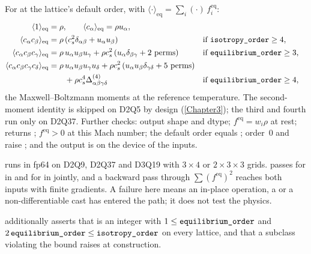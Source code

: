 For  at the lattice's default order, with
$\langle\cdot\rangle_{\mathrm{eq}} = \sum_i (\cdot)\, f^{\mathrm{eq}}_i$:
\begin{align}
\langle 1 \rangle_{\mathrm{eq}} &= \rho, \qquad
\langle c_\alpha \rangle_{\mathrm{eq}} = \rho u_\alpha, \\
\langle c_\alpha c_\beta \rangle_{\mathrm{eq}}
  &= \rho\,(c_s^2\delta_{\alpha\beta} + u_\alpha u_\beta)
  &&\text{if } \texttt{isotropy\_order} \ge 4, \\
\langle c_\alpha c_\beta c_\gamma \rangle_{\mathrm{eq}}
  &= \rho\,u_\alpha u_\beta u_\gamma
     + \rho c_s^2\,(u_\alpha\delta_{\beta\gamma} + \text{2 perms})
  &&\text{if } \texttt{equilibrium\_order} \ge 3, \\
\langle c_\alpha c_\beta c_\gamma c_\delta \rangle_{\mathrm{eq}}
  &= \rho\,u_\alpha u_\beta u_\gamma u_\delta
     + \rho c_s^2\,(u_\alpha u_\beta\delta_{\gamma\delta} + \text{5 perms}) \nonumber \\
  &\qquad + \rho c_s^4\Delta^{(4)}_{\alpha\beta\gamma\delta}
  &&\text{if } \texttt{equilibrium\_order} \ge 4,
\end{align}
the Maxwell--Boltzmann moments at the reference temperature. The second-moment identity is
skipped on D2Q5 by design (\cref{Chapter3}); the third and fourth run only on D2Q37.
Further checks: output shape and dtype; $f^{\mathrm{eq}} = w_i\rho$ at rest;
 returns ; $f^{\mathrm{eq}} > 0$ at this
Mach number; the default order equals ; order~0 and
 raise ; and the output is on the device of
the inputs.

 runs in fp64 on D2Q9, D2Q37 and D3Q19
with $3\times4$ or $2\times3\times3$ grids.  passes for
 in  and for  in  jointly, and a
backward pass through $\sum (f^{\mathrm{eq}})^2$ reaches both inputs with finite gradients.
A failure here means an in-place operation, a  or a non-differentiable cast
has entered the path; it does not test the physics.

 additionally asserts that  is
an integer with $1 \le \texttt{equilibrium\_order}$ and
$2\,\texttt{equilibrium\_order} \le \texttt{isotropy\_order}$ on every lattice, and that a
subclass violating the bound raises  at construction.

